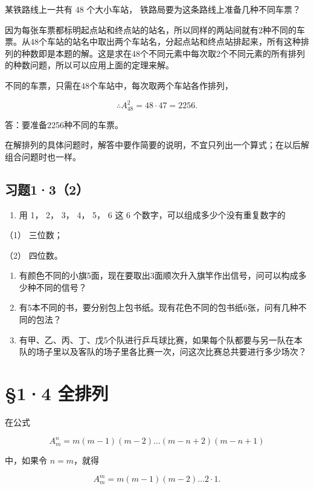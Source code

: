 某铁路线上一共有 48 个大小车站， 铁路局要为这条路线上准备几种不同车票？

因为每张车票都标明起点站和终点站的站名，所以同样的两站间就有2种不同的车票。从48个车站的站名中取出两个车站名，分起点站和终点站排起来，所有这种排列的种数即是本题的解。这是求在48个不同元素中每次取2个不同元素的所有排列的种数问题，所以可以应用上面的定理来解。

 不同的车票，只需在48个车站中，每次取两个车站各作排列，

\[
\therefore A _ {48} ^ {2} = 48 \cdot 47 = 2256.
\]

答：要准备2256种不同的车票。

在解排列的具体问题时，解答中要作简要的说明，不宜只列出一个算式；在以后解组合问题时也一样。

\subsection{习题1·3（2）}

\begin{enumerate}
\item
  用 1， 2， 3， 4， 5， 6 这 6 个数字，可以组成多少个没有重复数字的
\end{enumerate}

（1） 三位数；

（2） 四位数。

\begin{enumerate}[start=2]
\item
  有颜色不同的小旗5面，现在要取出3面顺次升入旗竿作出信号，问可以构成多少种不同的信号？
\item
  有5本不同的书，要分别包上包书纸。现有花色不同的包书纸6张，问有几种不同的包法？
\item
  有甲、乙、丙、丁、戊5个队进行乒乓球比赛，如果每个队都要与另一队在本队的场子里以及客队的场子里各比赛一次，问这次比赛总共要进行多少场次？
\end{enumerate}

\section{§1·4 全排列}

在公式

\[
A _ {m} ^ {n} = m (m - 1) (m - 2) \dots (m - n + 2) (m - n + 1)
\]

中，如果令 \(n = m\)，就得

\[
A _ {m} ^ {m} = m (m - 1) (m - 2) \dots 2 \cdot 1.
\]

